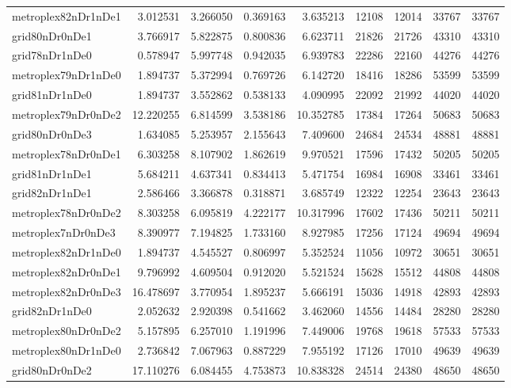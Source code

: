 \begin{longtable}{|l|r|r|r|r|r|r|r|r|}
metroplex82nDr1nDe1 & 3.012531 & 3.266050 & 0.369163 & 3.635213 & 12108 & 12014 & 33767 & 33767 \\
grid80nDr0nDe1 & 3.766917 & 5.822875 & 0.800836 & 6.623711 & 21826 & 21726 & 43310 & 43310 \\
grid78nDr1nDe0 & 0.578947 & 5.997748 & 0.942035 & 6.939783 & 22286 & 22160 & 44276 & 44276 \\
metroplex79nDr1nDe0 & 1.894737 & 5.372994 & 0.769726 & 6.142720 & 18416 & 18286 & 53599 & 53599 \\
grid81nDr1nDe0 & 1.894737 & 3.552862 & 0.538133 & 4.090995 & 22092 & 21992 & 44020 & 44020 \\
metroplex79nDr0nDe2 & 12.220255 & 6.814599 & 3.538186 & 10.352785 & 17384 & 17264 & 50683 & 50683 \\
grid80nDr0nDe3 & 1.634085 & 5.253957 & 2.155643 & 7.409600 & 24684 & 24534 & 48881 & 48881 \\
metroplex78nDr0nDe1 & 6.303258 & 8.107902 & 1.862619 & 9.970521 & 17596 & 17432 & 50205 & 50205 \\
grid81nDr1nDe1 & 5.684211 & 4.637341 & 0.834413 & 5.471754 & 16984 & 16908 & 33461 & 33461 \\
grid82nDr1nDe1 & 2.586466 & 3.366878 & 0.318871 & 3.685749 & 12322 & 12254 & 23643 & 23643 \\
metroplex78nDr0nDe2 & 8.303258 & 6.095819 & 4.222177 & 10.317996 & 17602 & 17436 & 50211 & 50211 \\
metroplex7nDr0nDe3 & 8.390977 & 7.194825 & 1.733160 & 8.927985 & 17256 & 17124 & 49694 & 49694 \\
metroplex82nDr1nDe0 & 1.894737 & 4.545527 & 0.806997 & 5.352524 & 11056 & 10972 & 30651 & 30651 \\
metroplex82nDr0nDe1 & 9.796992 & 4.609504 & 0.912020 & 5.521524 & 15628 & 15512 & 44808 & 44808 \\
metroplex82nDr0nDe3 & 16.478697 & 3.770954 & 1.895237 & 5.666191 & 15036 & 14918 & 42893 & 42893 \\
grid82nDr1nDe0 & 2.052632 & 2.920398 & 0.541662 & 3.462060 & 14556 & 14484 & 28280 & 28280 \\
metroplex80nDr0nDe2 & 5.157895 & 6.257010 & 1.191996 & 7.449006 & 19768 & 19618 & 57533 & 57533 \\
metroplex80nDr1nDe0 & 2.736842 & 7.067963 & 0.887229 & 7.955192 & 17126 & 17010 & 49639 & 49639 \\
grid80nDr0nDe2 & 17.110276 & 6.084455 & 4.753873 & 10.838328 & 24514 & 24380 & 48650 & 48650 \\

\end{longtable}
